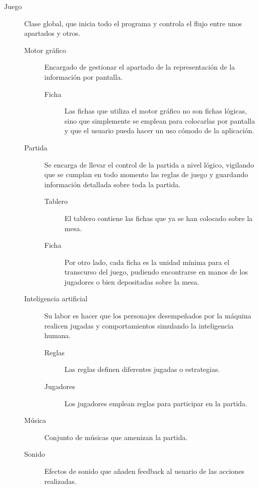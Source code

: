 \begin{description}
    \item[Juego] Clase global, que inicia todo el programa y controla el flujo entre unos apartados y otros.
    \begin{description}
        \item[Motor gráfico] Encargado de gestionar el apartado de la representación de la información por pantalla.
        \begin{description}
            \item[Ficha] Las fichas que utiliza el motor gráfico no son fichas lógicas, sino que simplemente se
                emplean para colocarlas por pantalla y que el usuario pueda hacer un uso cómodo de la aplicación.
        \end{description}
        \item[Partida] Se encarga de llevar el control de la partida a nivel lógico, vigilando que se cumplan
                en todo momento las reglas de juego y guardando información detallada sobre toda la partida.
        \begin{description}
            \item[Tablero] El tablero contiene las fichas que ya se han colocado sobre la mesa.
            \item[Ficha] Por otro lado, cada ficha es la unidad mínima para el transcurso del juego, pudiendo
                encontrarse en manos de los jugadores o bien depositadas sobre la mesa.
        \end{description}
        \item[Inteligencia artificial] Su labor es hacer que los personajes desempeñados por la máquina realicen
                jugadas y comportamientos simulando la inteligencia humana.
        \begin{description}
            \item[Reglas] Las reglas definen diferentes jugadas o estrategias.
            \item[Jugadores] Los jugadores emplean reglas para participar en la partida.
        \end{description}
        \item[Música] Conjunto de músicas que amenizan la partida.
        \item[Sonido] Efectos de sonido que añaden feedback al usuario de las acciones realizadas.
    \end{description}
\end{description}

